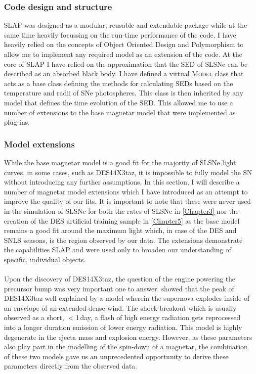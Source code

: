 \subsubsection{Code design and structure}
SLAP was designed as a modular, reusable and extendable package while at the same time heavily focussing on the run-time performance of the code. I have heavily relied on the concepts of Object Oriented Design and Polymorphism to allow me to implement any required model as an extension of the code. At the core of \textsc{SLAP} I have relied on the approximation that the SED of SLSNe can be described as an absorbed black body. I have defined a virtual \textsc{Model} class that acts as a base class defining the methods for calculating SEDs based on the temperature and radii of SNe photospheres. This class is then inherited by any model that defines the time evolution of the SED. This allowed me to use a number of extensions to the base magnetar model that were implemented as plug-ins.

\subsubsection{Model extensions} \label{sec:MagExtensions}
While the base magnetar model is a good fit for the majority of SLSNe light curves, in some cases, such as DES14X3taz, it is impossible to fully model the SN without introducing any further assumptions. In this section, I will describe a number of magnetar model extensions which I have introduced as an attempt to improve the quality of our fits. It is important to note that these were never used in the simulation of SLSNe for both the rates of SLSNe in \cref{Chapter3} nor the creation of the DES artificial training sample in \cref{Chapter5} as the base model remains a good fit around the maximum light which, in case of the DES and SNLS seasons, is the region observed by our data. The extensions demonstrate the capabilities \textsc{SLAP} and were used only to broaden our understanding of specific, individual objects.

\paragraph{\citet{Piro2015}}
Upon the discovery of DES14X3taz, the question of the engine powering the precursor bump was very important one to answer. \citet{Smith2016} showed that the peak of DES14X3taz well explained by a model wherein the supernova explodes inside of an envelope of an extended dense wind. The shock-breakout which is usually observed as a short, $<$1\,day, a flash of high energy radiation gets reprocessed into a longer duration emission of lower energy radiation. This model is highly degenerate in the ejecta mass and explosion energy. However, as these parameters also play part in the modelling of the spin-down of a magnetar, the combination of these two models gave us an unprecedented opportunity to derive these parameters directly from the observed data.

